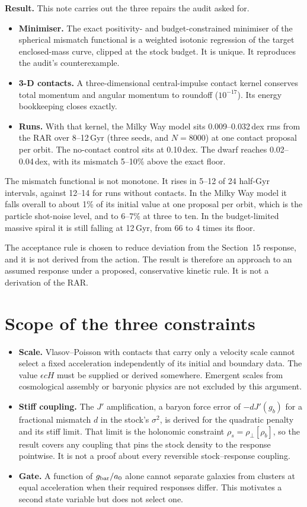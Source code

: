 \textbf{Result.} This note carries out the three repairs the audit asked for.
\begin{itemize}
\item \textbf{Minimiser.} The exact positivity- and budget-constrained minimiser of the spherical mismatch functional is a weighted isotonic regression of the target enclosed-mass curve, clipped at the stock budget. It is unique. It reproduces the audit's counterexample.
\item \textbf{3-D contacts.} A three-dimensional central-impulse contact kernel conserves total momentum and angular momentum to roundoff ($10^{-17}$). Its energy bookkeeping closes exactly.
\item \textbf{Runs.} With that kernel, the Milky Way model sits 0.009--0.032\,dex rms from the RAR over 8--12\,Gyr (three seeds, and $N=8000$) at one contact proposal per orbit. The no-contact control sits at 0.10\,dex. The dwarf reaches 0.02--0.04\,dex, with its mismatch 5--10\% above the exact floor.
\end{itemize}
The mismatch functional is not monotone. It rises in 5--12 of 24 half-Gyr intervals, against 12--14 for runs without contacts. In the Milky Way model it falls overall to about 1\% of its initial value at one proposal per orbit, which is the particle shot-noise level, and to 6--7\% at three to ten. In the budget-limited massive spiral it is still falling at 12\,Gyr, from 66 to 4 times its floor.

The acceptance rule is chosen to reduce deviation from the Section~15 response, and it is not derived from the action. The result is therefore an approach to an assumed response under a proposed, conservative kinetic rule. It is not a derivation of the RAR.

\section{Scope of the three constraints}
\begin{itemize}
\item \textbf{Scale.} Vlasov--Poisson with contacts that carry only a velocity scale cannot select a fixed acceleration independently of its initial and boundary data. The value $\epsilon cH$ must be supplied or derived somewhere. Emergent scales from cosmological assembly or baryonic physics are not excluded by this argument.
\item \textbf{Stiff coupling.} The $J'$ amplification, a baryon force error of $-dJ'(g_b)$ for a fractional mismatch $d$ in the stock's $\sigma^2$, is derived for the quadratic penalty and its stiff limit. That limit is the holonomic constraint $\rho_s=\rho_\perp[\rho_b]$, so the result covers any coupling that pins the stock density to the response pointwise. It is not a proof about every reversible stock--response coupling.
\item \textbf{Gate.} A function of $g_{\rm bar}/a_0$ alone cannot separate galaxies from clusters at equal acceleration when their required responses differ. This motivates a second state variable but does not select one.
\end{itemize}

